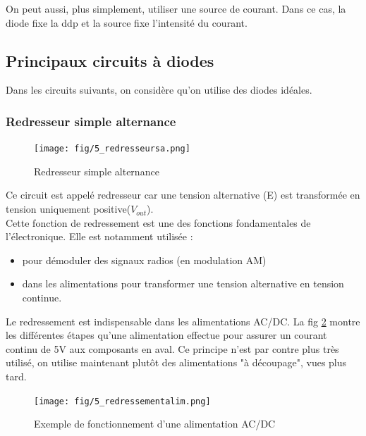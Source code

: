 \documentclass[a4paper]{article}
\begin{document}
    On peut aussi, plus simplement, utiliser une source de courant. Dans ce cas, 
    la diode fixe la ddp et la source fixe l'intensité du courant.

    \subsection{Principaux circuits à diodes}
    Dans les circuits suivants, on considère qu'on utilise des diodes idéales.

    \subsubsection{Redresseur simple alternance}
    \begin{figure}[H]
        \begin{center}
            \texttt{[image: fig/5\_redresseursa.png]}
            \caption{Redresseur simple alternance}
            \label{fig:5_redresseursa}
        \end{center}
    \end{figure}
    Ce circuit est appelé redresseur car une tension alternative (E) est transformée
    en tension uniquement positive($V_{out}$).\\

    Cette fonction de redressement est une des fonctions fondamentales de l'électronique.
    Elle est notamment utilisée :
    \begin{itemize}
        \item pour démoduler des signaux radios (en modulation AM)
        \item dans les alimentations pour transformer une tension alternative en
        tension continue.
    \end{itemize}

    Le redressement est indispensable dans les alimentations AC/DC. La fig \ref{fig:5_redressementalim} 
    montre les différentes étapes qu'une alimentation effectue pour assurer un 
    courant continu de 5V aux composants en aval. Ce principe n'est par contre
    plus très utilisé, on utilise maintenant plutôt des alimentations "à découpage", 
    vues plus tard.
    \begin{figure}[H]
        \begin{center}
            \texttt{[image: fig/5\_redressementalim.png]}
            \caption{Exemple de fonctionnement d'une alimentation AC/DC}
            \label{fig:5_redressementalim}
        \end{center}
    \end{figure}
\end{document}
